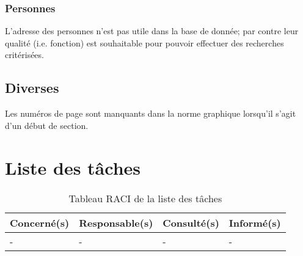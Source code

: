 \documentclass[11pt,fleqn]{report}
\begin{document}


\subsubsection{Personnes}

L'adresse des personnes n'est pas utile dans la base de donnée; par contre leur qualité (i.e. fonction) est souhaitable pour pouvoir effectuer des recherches critérisées.


\subsection{Diverses}

Les numéros de page sont manquants dans la norme graphique lorsqu'il s'agit d'un début de section.


\newpage
\section{Liste des tâches}

\begin{table}[h]
	\begin{tabularx}{\linewidth}{X X X X}
		\toprule
		\textbf{Concerné(s)} & \textbf{Responsable(s)} & \textbf{Consulté(s)} & \textbf{Informé(s)} \\
		\midrule
		- & - & - & - \\
		\bottomrule
	\end{tabularx}
	\caption{Tableau RACI de la liste des tâches}
\end{table}

\end{document}
